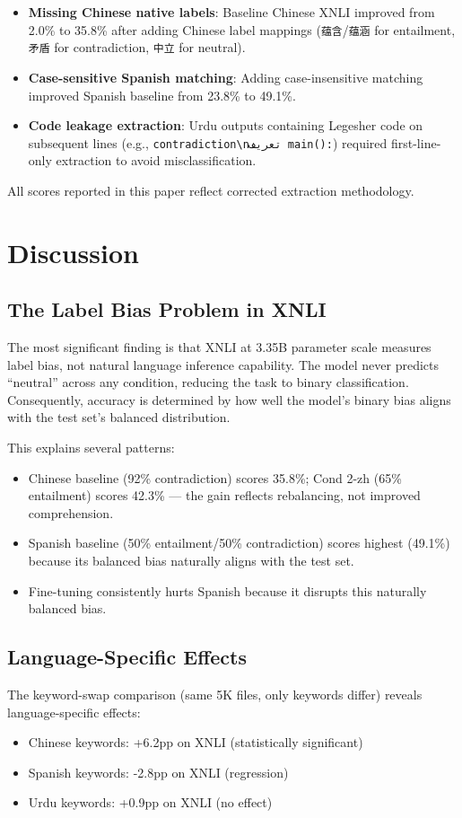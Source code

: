 \documentclass[conference]{IEEEtran}
\begin{document}
\begin{itemize}
\item \textbf{Missing Chinese native labels}: Baseline Chinese XNLI improved from 2.0\% to 35.8\% after adding Chinese label mappings (\texttt{蕴含}/\texttt{蕴涵} for entailment, \texttt{矛盾} for contradiction, \texttt{中立} for neutral).
\item \textbf{Case-sensitive Spanish matching}: Adding case-insensitive matching improved Spanish baseline from 23.8\% to 49.1\%.
\item \textbf{Code leakage extraction}: Urdu outputs containing Legesher code on subsequent lines (e.g., \texttt{contradiction\textbackslash nتعریف main():}) required first-line-only extraction to avoid misclassification.
\end{itemize}

All scores reported in this paper reflect corrected extraction methodology.

\section{Discussion}

\subsection{The Label Bias Problem in XNLI}
The most significant finding is that XNLI at 3.35B parameter scale measures label bias, not natural language inference capability. The model never predicts ``neutral'' across any condition, reducing the task to binary classification. Consequently, accuracy is determined by how well the model's binary bias aligns with the test set's balanced distribution.

This explains several patterns:
\begin{itemize}
\item Chinese baseline (92\% contradiction) scores 35.8\%; Cond 2-zh (65\% entailment) scores 42.3\% — the gain reflects rebalancing, not improved comprehension.
\item Spanish baseline (50\% entailment/50\% contradiction) scores highest (49.1\%) because its balanced bias naturally aligns with the test set.
\item Fine-tuning consistently hurts Spanish because it disrupts this naturally balanced bias.
\end{itemize}

\subsection{Language-Specific Effects}
The keyword-swap comparison (same 5K files, only keywords differ) reveals language-specific effects:
\begin{itemize}
\item Chinese keywords: +6.2pp on XNLI (statistically significant)
\item Spanish keywords: -2.8pp on XNLI (regression)
\item Urdu keywords: +0.9pp on XNLI (no effect)
\end{itemize}
\end{document}
